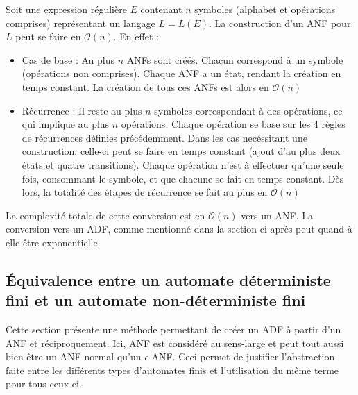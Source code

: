 \begin{complexity}
	Soit une expression régulière $E$ contenant $n$ symboles (alphabet et opérations comprises) représentant un langage $L=L(E)$.
  La construction d'un ANF pour $L$ peut se faire en $\mathcal{O}(n)$. En effet :
	\begin{itemize}
		\item Cas de base : Au plus $n$ ANFs sont créés. Chacun correspond à un symbole (opérations non comprises). Chaque ANF a un état, rendant la création en temps constant. La création de tous ces ANFs est alors en $\mathcal{O}(n)$
		\item Récurrence : Il reste au plus $n$ symboles correspondant à des opérations, ce qui implique au plus $n$ opérations. Chaque opération se base sur les 4 règles de récurrences définies précédemment. Dans les cas necéssitant une construction, celle-ci peut se faire en temps constant (ajout d'au plus deux états et quatre transitions). Chaque opération n'est à effectuer qu'une seule fois, consommant le symbole, et que chacune se fait en temps constant. Dès lors, la totalité des étapes de récurrence se fait au plus en $\mathcal{O}(n)$
	\end{itemize}

	La complexité totale de cette conversion est en $\mathcal{O}(n)$ vers un ANF. La conversion vers un ADF, comme mentionné dans la section ci-après peut quand à elle être exponentielle.

\end{complexity}




\subsection{Équivalence entre un automate déterministe fini et un automate non-déterministe fini}\label{ss:eqadfanf}
Cette section présente une méthode permettant de créer un ADF à partir d'un ANF et réciproquement. Ici, ANF est considéré au sens-large et peut tout aussi bien être un ANF normal qu'un $\epsilon$-ANF. Ceci permet de justifier l'abstraction faite entre les différents types d'automates finis et l'utilisation du même terme pour tous ceux-ci.

